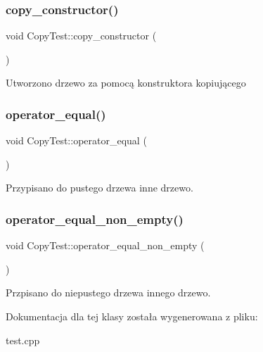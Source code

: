 \subsubsection{\texorpdfstring{copy\+\_\+constructor()}{copy\_constructor()}}
{\footnotesize\ttfamily void Copy\+Test\+::copy\+\_\+constructor (\begin{DoxyParamCaption}{ }\end{DoxyParamCaption})\hspace{0.3cm}{\ttfamily [inline]}}

Utworzono drzewo za pomocą konstruktora kopiującego \mbox{\label{class_copy_test_aea0770d1ee3defbee564d72a7d3d9a44}} 
\subsubsection{\texorpdfstring{operator\+\_\+equal()}{operator\_equal()}}
{\footnotesize\ttfamily void Copy\+Test\+::operator\+\_\+equal (\begin{DoxyParamCaption}{ }\end{DoxyParamCaption})\hspace{0.3cm}{\ttfamily [inline]}}

Przypisano do pustego drzewa inne drzewo. \mbox{\label{class_copy_test_a37811781b4c94cc5414b236290aae0d0}} 
\subsubsection{\texorpdfstring{operator\+\_\+equal\+\_\+non\+\_\+empty()}{operator\_equal\_non\_empty()}}
{\footnotesize\ttfamily void Copy\+Test\+::operator\+\_\+equal\+\_\+non\+\_\+empty (\begin{DoxyParamCaption}{ }\end{DoxyParamCaption})\hspace{0.3cm}{\ttfamily [inline]}}

Przpisano do niepustego drzewa innego drzewo. 

Dokumentacja dla tej klasy została wygenerowana z pliku\+:\begin{DoxyCompactItemize}
\item 
test.\+cpp\end{DoxyCompactItemize}
